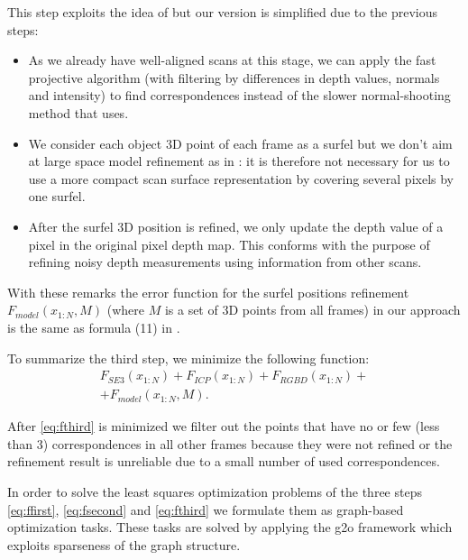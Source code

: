 \documentclass[letterpaper, 10 pt, conference]{ieeeconf}  %
\begin{document}
This step exploits the idea of \cite{ruhnke2012highly} but our version 
is simplified due to the previous steps: 

\begin{itemize}
 \item As we already have well-aligned scans at this stage, we can apply 
 the fast projective algorithm \cite{rusinkiewicz2001efficient} 
 (with filtering by differences in depth values, 
 normals and intensity) to find correspondences instead of the slower
 normal-shooting method that \cite{ruhnke2012highly} uses.
 \item We consider each object 3D point of each frame as 
 a surfel but we don't aim at large space model refinement as in \cite{ruhnke2012highly}:
 it is therefore not necessary for us to use a more compact scan surface representation by covering several pixels 
 by one surfel.
 \item After the surfel 3D position is refined, we only update the depth value 
 of a pixel in the original pixel depth map. This conforms with the purpose of
 refining noisy depth measurements using information from other scans.
\end{itemize}

With these remarks the error function for the surfel positions refinement 
$F_{model}(x_{1:N}, M)$ (where $M$ is a set of 3D points from 
all frames) in our approach is the same as formula (11) in \cite{ruhnke2012highly}.

To summarize the third step, we minimize the following function:
\begin{multline} \label{eq:fthird}
F_{SE3}(x_{1:N}) + F_{ICP}(x_{1:N}) + F_{RGBD}(x_{1:N}) + \\
+ F_{model}(x_{1:N}, M).
\end{multline}

After \eqref{eq:fthird} is minimized we filter out the points 
that have no or few (less than 3) correspondences in
all other frames because they were not refined or the refinement result
is unreliable due to a small number of used correspondences.

In order to solve the least squares optimization problems 
of the three steps \eqref{eq:ffirst}, \eqref{eq:fsecond} and \eqref{eq:fthird} 
we formulate them as graph-based optimization tasks.
These tasks are solved by applying the g2o framework 
\cite{kuemmerle2011g2o} which exploits sparseness of the graph structure.
\end{document}
